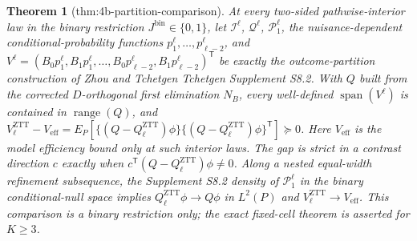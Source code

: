 \documentclass{article}
\newtheorem{theorem}{Theorem}
\begin{document}
\begin{theorem}[thm:4b-partition-comparison]\label{thm:4b-partition-comparison}
At every two-sided pathwise-interior law in the binary restriction \(J^{\mathrm{bin}}\in\{0,1\}\), let \(\mathcal I^{\ell}\), \(\mathcal Q^{\ell}\), \(\mathcal P_1^{\ell}\), the nuisance-dependent conditional-probability functions \(p_1^{\ell},\ldots,p_{\ell-2}^{\ell}\), and \(V^{\ell}=(B_0p_1^{\ell},B_1p_1^{\ell},\ldots,B_0p_{\ell-2}^{\ell},B_1p_{\ell-2}^{\ell})^{\mathsf T}\) be exactly the outcome-partition construction of Zhou and Tchetgen Tchetgen Supplement S8.2. With \(Q\) built from the corrected \(D\)-orthogonal first elimination \(N_B\), every well-defined \(\operatorname{span}(V^{\ell})\) is contained in \(\operatorname{range}(Q)\), and \(V_{\ell}^{\mathrm{ZTT}}-V_{\mathrm{eff}}=E_P[\{(Q-Q_{\ell}^{\mathrm{ZTT}})\phi\}\{(Q-Q_{\ell}^{\mathrm{ZTT}})\phi\}^{\mathsf T}]\succeq0\). Here \(V_{\mathrm{eff}}\) is the model efficiency bound only at such interior laws. The gap is strict in a contrast direction \(c\) exactly when \(c^{\mathsf T}(Q-Q_{\ell}^{\mathrm{ZTT}})\phi\neq0\). Along a nested equal-width refinement subsequence, the Supplement S8.2 density of \(\mathcal P_1^{\ell}\) in the binary conditional-null space implies \(Q_{\ell}^{\mathrm{ZTT}}\phi\to Q\phi\) in \(L^{2}(P)\) and \(V_{\ell}^{\mathrm{ZTT}}\to V_{\mathrm{eff}}\). This comparison is a binary restriction only; the exact fixed-cell theorem is asserted for \(K\geq3\).
\end{theorem}
\end{document}
